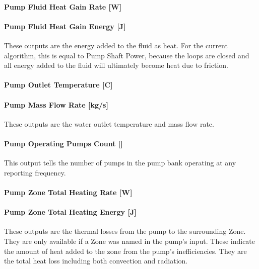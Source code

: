 \paragraph{Pump Fluid Heat Gain Rate {[}W{]}}\label{pump-fluid-heat-gain-rate-w-4}

\paragraph{Pump Fluid Heat Gain Energy {[}J{]}}\label{pump-fluid-heat-gain-energy-j-4}

These outputs are the energy added to the fluid as heat. For the current algorithm, this is equal to Pump Shaft Power, because the loops are closed and all energy added to the fluid will ultimately become heat due to friction.

\paragraph{Pump Outlet Temperature {[}C{]}}\label{pump-outlet-temperature-c-4}

\paragraph{Pump Mass Flow Rate {[}kg/s{]}}\label{pump-mass-flow-rate-kgs-4}

These outputs are the water outlet temperature and mass flow rate.

\paragraph{Pump Operating Pumps Count {[]}}\label{pump-operating-pumps-count-1}

This output tells the number of pumps in the pump bank operating at any reporting frequency.

\paragraph{Pump Zone Total Heating Rate {[}W{]}}\label{pump-zone-total-heating-rate-w-4}

\paragraph{Pump Zone Total Heating Energy {[}J{]}}\label{pump-zone-total-heating-energy-j-4}

These outputs are the thermal losses from the pump to the surrounding Zone. They are only available if a Zone was named in the pump's input. These indicate the amount of heat added to the zone from the pump's inefficiencies. They are the total heat loss including both convection and radiation.

